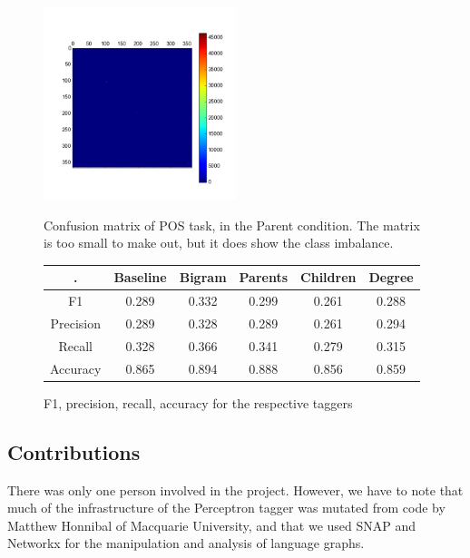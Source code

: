 \documentclass[12pt]{article}
\begin{document}
\begin{figure}
  \includegraphics[width=0.50\textwidth]{kron_conf_mat}
  \label{fig:confmat}
  \caption{Confusion matrix of POS task, in the Parent condition. The matrix is too small to make out, but it does show the class imbalance.}
\end{figure}

\begin{figure}
  \begin{tabular}{c || c | c | c | c | c}
    \hline
    . & Baseline & Bigram & Parents & Children & Degree \\
    \hline
    F1 & 0.289 & 0.332 & 0.299 & 0.261 & 0.288 \\
    Precision & 0.289 & 0.328 & 0.289 & 0.261 & 0.294 \\
    Recall & 0.328 & 0.366 & 0.341 & 0.279 & 0.315 \\
    Accuracy & 0.865 & 0.894 & 0.888 & 0.856 & 0.859 \\
    \hline
  \end{tabular}
  \caption{F1, precision, recall, accuracy for the respective taggers}
\end{figure}

\subsection*{Contributions}
There was only one person involved in the project. However, we have to note that much of the infrastructure of the Perceptron tagger was mutated from code by Matthew Honnibal of Macquarie University, and that we used SNAP and Networkx for the manipulation and analysis of language graphs. %

\end{document}
